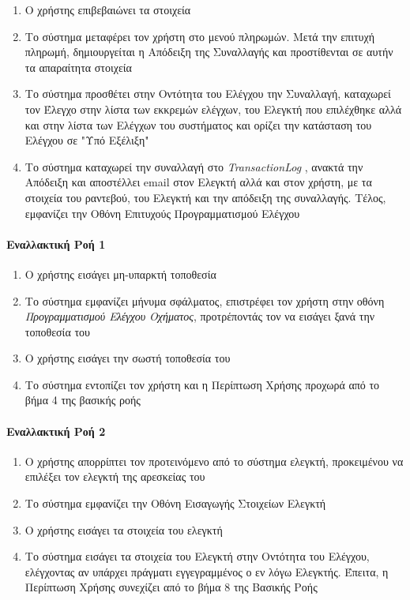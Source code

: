 \documentclass{../ol-softwaremanual}
\begin{document}
\begin{enumerate}
		\item Ο χρήστης επιβεβαιώνει τα στοιχεία
		\item Το σύστημα μεταφέρει τον χρήστη στο μενού πληρωμών. Μετά την επιτυχή πληρωμή, δημιουργείται η Απόδειξη της Συναλλαγής και προστίθενται σε αυτήν τα απαραίτητα στοιχεία
		\item Το σύστημα προσθέτει στην Οντότητα του Ελέγχου την Συναλλαγή, καταχωρεί τον Έλεγχο στην λίστα των εκκρεμών ελέγχων, του Ελεγκτή που επιλέχθηκε αλλά και στην λίστα των Ελέγχων του συστήματος και ορίζει την κατάσταση του Ελέγχου σε \en"\gr Υπό Εξέλιξη\en"\gr
		\item Το σύστημα καταχωρεί την συναλλαγή στο \en \textit{TransactionLog} \gr, ανακτά την Απόδειξη και αποστέλλει \en email \gr στον Ελεγκτή αλλά και στον χρήστη, με τα στοιχεία του ραντεβού, του Ελεγκτή και την απόδειξη της συναλλαγής. Τέλος, εμφανίζει την Οθόνη Επιτυχούς Προγραμματισμού Ελέγχου		
	\end{enumerate}
	
	
	
	\paragraph{Εναλλακτική Ροή 1}
	
	\begin{enumerate}
		\item Ο χρήστης εισάγει μη-υπαρκτή τοποθεσία
		\item Το σύστημα εμφανίζει μήνυμα σφάλματος, επιστρέφει τον χρήστη στην οθόνη \textit{Προγραμματισμού Ελέγχου Οχήματος}, προτρέποντάς τον να εισάγει ξανά την τοποθεσία του
		\item Ο χρήστης εισάγει την σωστή τοποθεσία του
		\item Το σύστημα εντοπίζει τον χρήστη και η Περίπτωση Χρήσης προχωρά από το βήμα 4 της βασικής ροής
	\end{enumerate}
	
	\paragraph{Εναλλακτική Ροή 2}
	
	\begin{enumerate}
		\item Ο χρήστης απορρίπτει τον προτεινόμενο από το σύστημα ελεγκτή, προκειμένου να επιλέξει τον ελεγκτή της αρεσκείας του
		\item Το σύστημα εμφανίζει την Οθόνη Εισαγωγής Στοιχείων Ελεγκτή
		\item Ο χρήστης εισάγει τα στοιχεία του ελεγκτή
		\item Το σύστημα εισάγει τα στοιχεία του Ελεγκτή στην Οντότητα του Ελέγχου, ελέγχοντας αν υπάρχει πράγματι εγγεγραμμένος ο εν λόγω Ελεγκτής. Έπειτα, η Περίπτωση Χρήσης συνεχίζει από το βήμα 8 της Βασικής Ροής
	\end{enumerate}	
	
\end{document}
